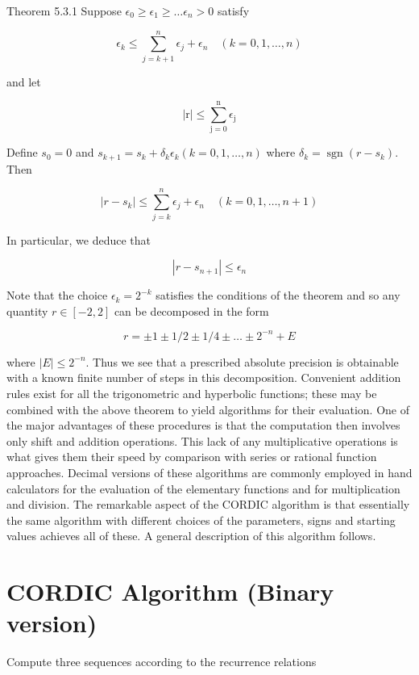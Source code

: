 \documentclass[10pt]{article}
\begin{document}
Theorem 5.3.1 Suppose $\epsilon_{0} \geqslant \epsilon_{1} \geqslant \ldots \epsilon_{n}>0$ satisfy


\begin{equation*}
\epsilon_{k} \leqslant \sum_{j=k+1}^{n} \epsilon_{j}+\epsilon_{n} \quad(k=0,1, \ldots, n) \tag{5.3.2}
\end{equation*}


and let

$$
|\mathrm{r}| \leqslant \sum_{\mathrm{j}=0}^{\mathrm{n}} \epsilon_{\mathrm{j}}
$$

Define $s_{0}=0$ and $s_{k+1}=s_{k}+\delta_{k} \epsilon_{k}(k=0,1, \ldots, n)$ where $\delta_{k}=\operatorname{sgn}\left(r-s_{k}\right)$. Then


\begin{equation*}
\left|r-s_{k}\right| \leqslant \sum_{j=k}^{n} \epsilon_{j}+\epsilon_{n} \quad(k=0,1, \ldots, n+1) \tag{5.3.3}
\end{equation*}


In particular, we deduce that

$$
\left|r-s_{n+1}\right| \leqslant \epsilon_{n}
$$

Note that the choice $\epsilon_{k}=2^{-k}$ satisfies the conditions of the theorem and so any quantity $r \in[-2,2]$ can be decomposed in the form

$$
r= \pm 1 \pm 1 / 2 \pm 1 / 4 \pm \ldots \pm 2^{-n}+E
$$

where $|E| \leqslant 2^{-n}$. Thus we see that a prescribed absolute precision is obtainable with a known finite number of steps in this decomposition. Convenient addition rules exist for all the trigonometric and hyperbolic functions; these may be combined with the above theorem to yield algorithms for their evaluation. One of the major advantages of these procedures is that the computation then involves only shift and addition operations. This lack of any multiplicative operations is what gives them their speed by comparison with series or rational function approaches. Decimal versions of these algorithms are commonly employed in hand calculators for the evaluation of the elementary functions and for multiplication and division. The remarkable aspect of the CORDIC algorithm is that essentially the same algorithm with different choices of the parameters, signs and starting values achieves all of these. A general description of this algorithm follows.

\section*{CORDIC Algorithm (Binary version)}
Compute three sequences according to the recurrence relations
\end{document}
